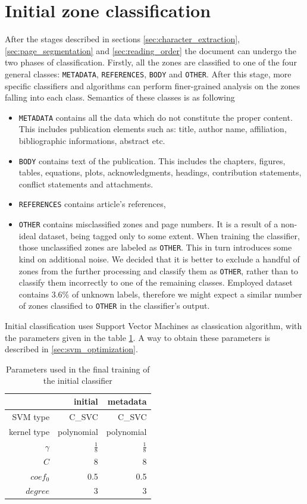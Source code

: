 \section{Initial zone classification}
After the stages described in sections \ref{sec:character_extraction}, \ref{sec:page_segmentation} and \ref{sec:reading_order} the document can undergo the two phases of classification. Firstly, all the zones are classified to one of the four general classes: \verb+METADATA+, \verb+REFERENCES+, \verb+BODY+ and \verb+OTHER+. After this stage, more specific classifiers and algorithms can perform finer-grained analysis on the zones falling into each class. Semantics of these classes is as following
\begin{itemize}
\item \verb+METADATA+ contains all the data which do not constitute the proper content. This includes publication elements such as: title, author name, affiliation, bibliographic informations, abstract etc.
\item \verb+BODY+ contains text of the publication. This includes the chapters, figures, tables, equations, plots, acknowledgments, headings, contribution statements, conflict statements and attachments.
\item \verb+REFERENCES+ contains article's references,
\item \verb+OTHER+ contains misclassified zones and page numbers. It is a result of a non-ideal dataset, being tagged only to some extent. When training the classifier, those unclassified zones are labeled as \verb+OTHER+. This in turn introduces some kind on additional noise. We decided that it is better to exclude a handful of zones from the further processing and classify them as \verb+OTHER+, rather than to classify them incorrectly to one of the remaining classes. Employed dataset contains 3.6\% of unknown labels, therefore we might expect a similar number of zones classified to \verb+OTHER+ in the classifier's output.
\end{itemize}
\quad
Initial classification uses Support Vector Machines as classication algorithm, with the parameters given in the table \ref{tab:initial_classifier_parameters}. A way to obtain these parameters is described in \ref{sec:svm_optimization}.
\begin{table}
\centering
\begin{tabular}{@{}rrr@{}}
\toprule
& initial & metadata \\
\midrule
SVM type & C\_SVC & C\_SVC \\ 
kernel type & polynomial & polynomial \\
$\gamma$ & $\frac{1}{8}$ & $\frac{1}{8}$ \\ 
$C$ & 8 & 8 \\
$coef_0$ & 0.5 & 0.5 \\
$degree$ & 3 & 3 \\
\bottomrule
\end{tabular}
\caption{Parameters used in the final training of the initial classifier}
\label{tab:initial_classifier_parameters}
\end{table} 
